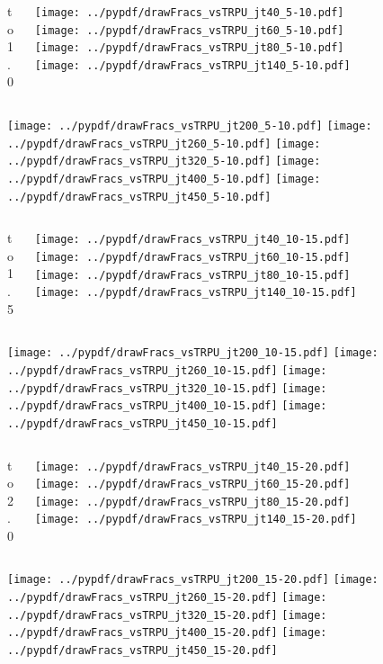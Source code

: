 \documentclass[aspectratio=169]{beamer}
\begin{document}
\begin{figure}[p]
\flushleft
\begin{columns}[T]
\begin{column}{.2\linewidth}
 to 1.0
\end{column}
\begin{column}{.8\linewidth}
\texttt{[image: ../pypdf/drawFracs\_vsTRPU\_jt40\_5-10.pdf]}
\texttt{[image: ../pypdf/drawFracs\_vsTRPU\_jt60\_5-10.pdf]}
\texttt{[image: ../pypdf/drawFracs\_vsTRPU\_jt80\_5-10.pdf]}
\texttt{[image: ../pypdf/drawFracs\_vsTRPU\_jt140\_5-10.pdf]}
\end{column}
\end{columns}
\texttt{[image: ../pypdf/drawFracs\_vsTRPU\_jt200\_5-10.pdf]}
\texttt{[image: ../pypdf/drawFracs\_vsTRPU\_jt260\_5-10.pdf]}
\texttt{[image: ../pypdf/drawFracs\_vsTRPU\_jt320\_5-10.pdf]}
\texttt{[image: ../pypdf/drawFracs\_vsTRPU\_jt400\_5-10.pdf]}
\texttt{[image: ../pypdf/drawFracs\_vsTRPU\_jt450\_5-10.pdf]}
\end{figure}

\begin{figure}[p]
\flushleft
\begin{columns}[T]
\begin{column}{.2\linewidth}
 to 1.5
\end{column}
\begin{column}{.8\linewidth}
\texttt{[image: ../pypdf/drawFracs\_vsTRPU\_jt40\_10-15.pdf]}
\texttt{[image: ../pypdf/drawFracs\_vsTRPU\_jt60\_10-15.pdf]}
\texttt{[image: ../pypdf/drawFracs\_vsTRPU\_jt80\_10-15.pdf]}
\texttt{[image: ../pypdf/drawFracs\_vsTRPU\_jt140\_10-15.pdf]}
\end{column}
\end{columns}
\texttt{[image: ../pypdf/drawFracs\_vsTRPU\_jt200\_10-15.pdf]}
\texttt{[image: ../pypdf/drawFracs\_vsTRPU\_jt260\_10-15.pdf]}
\texttt{[image: ../pypdf/drawFracs\_vsTRPU\_jt320\_10-15.pdf]}
\texttt{[image: ../pypdf/drawFracs\_vsTRPU\_jt400\_10-15.pdf]}
\texttt{[image: ../pypdf/drawFracs\_vsTRPU\_jt450\_10-15.pdf]}
\end{figure}

\begin{figure}[p]
\flushleft
\begin{columns}[T]
\begin{column}{.2\linewidth}
 to 2.0
\end{column}
\begin{column}{.8\linewidth}
\texttt{[image: ../pypdf/drawFracs\_vsTRPU\_jt40\_15-20.pdf]}
\texttt{[image: ../pypdf/drawFracs\_vsTRPU\_jt60\_15-20.pdf]}
\texttt{[image: ../pypdf/drawFracs\_vsTRPU\_jt80\_15-20.pdf]}
\texttt{[image: ../pypdf/drawFracs\_vsTRPU\_jt140\_15-20.pdf]}
\end{column}
\end{columns}
\texttt{[image: ../pypdf/drawFracs\_vsTRPU\_jt200\_15-20.pdf]}
\texttt{[image: ../pypdf/drawFracs\_vsTRPU\_jt260\_15-20.pdf]}
\texttt{[image: ../pypdf/drawFracs\_vsTRPU\_jt320\_15-20.pdf]}
\texttt{[image: ../pypdf/drawFracs\_vsTRPU\_jt400\_15-20.pdf]}
\texttt{[image: ../pypdf/drawFracs\_vsTRPU\_jt450\_15-20.pdf]}
\end{figure}
\end{document}
